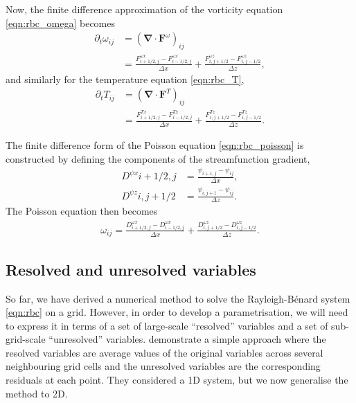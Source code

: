 \documentclass{article}
\renewcommand\vec{\bm}
\newcommand{\grad}{\vec{\nabla}}
\newcommand{\rb}{Rayleigh-B\'{e}nard}
\begin{document}
Now, the finite difference approximation of the vorticity equation
\autoref{eqn:rbc_omega} becomes
\begin{equation} \label{eqn:omega_tend}
\begin{aligned}
    \partial_t \omega_{ij} &= (\grad \cdot \vec{F}^\omega)_{ij} \\
        &= \frac{F^{\omega x}_{i+1/2,j} - F^{\omega x}_{i-1/2,j}}{\Delta x}
        + \frac{F^{\omega z}_{i,j+1/2} - F^{\omega z}_{i,j-1/2}}{\Delta z},
\end{aligned}
\end{equation}
and similarly for the temperature equation \autoref{eqn:rbc_T},
\begin{align*}
    \partial_t T_{ij} &= (\grad \cdot \vec{F}^T)_{ij} \\
    &= \frac{F^{Tx}_{i+1/2,j} - F^{Tx}_{i-1/2,j}}{\Delta x}
    + \frac{F^{Tz}_{i,j+1/2} - F^{Tz}_{i,j-1/2}}{\Delta z}.
\end{align*}

The finite difference form of the Poisson equation \autoref{eqn:rbc_poisson}
is constructed by defining the components of the streamfunction gradient,
\begin{equation} \label{eqn:T_tend}
\begin{aligned}
    D^{\psi x}{i+1/2,j} &= \frac{\psi_{i+1,j} - \psi_{ij}}{\Delta x}, \\
    D^{\psi z}{i,j+1/2} &= \frac{\psi_{i,j+1} - \psi_{ij}}{\Delta z}.
\end{aligned}
\end{equation}
The Poisson equation then becomes
\begin{equation} \label{eqn:poisson_discrete}
    \begin{aligned}
    \omega_{ij}
        = \frac{D^{\omega x}_{i+1/2,j} - D^{\omega x}_{i-1/2,j}}{\Delta x}
        + \frac{D^{\omega z}_{i,j+1/2} - D^{\omega z}_{i,j-1/2}}{\Delta z}.
    \end{aligned}
\end{equation}

\subsection{Resolved and unresolved variables}
So far, we have derived a numerical method to solve the \rb{} system
\autoref{eqn:rbc} on a grid. However, in order to develop a parametrisation, we
will need to express it in terms of a set of large-scale ``resolved'' variables
and a set of sub-grid-scale ``unresolved'' variables. \textcite{zacharuk2018}
demonstrate a simple approach where the resolved variables are average values
of the original variables across several neighbouring grid cells and the
unresolved variables are the corresponding residuals at each point. They
considered a 1D system, but we now generalise the method to 2D.
\end{document}
